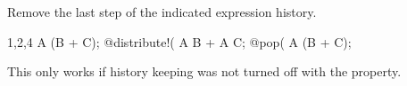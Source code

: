 
Remove the last step of the indicated expression
history. 
\begin{screen}{1,2,4}
A (B + C);
@distribute!(%
A B + A C;
@pop(%
A (B + C);
\end{screen}
This only works if history keeping was not turned off with
the  property.

